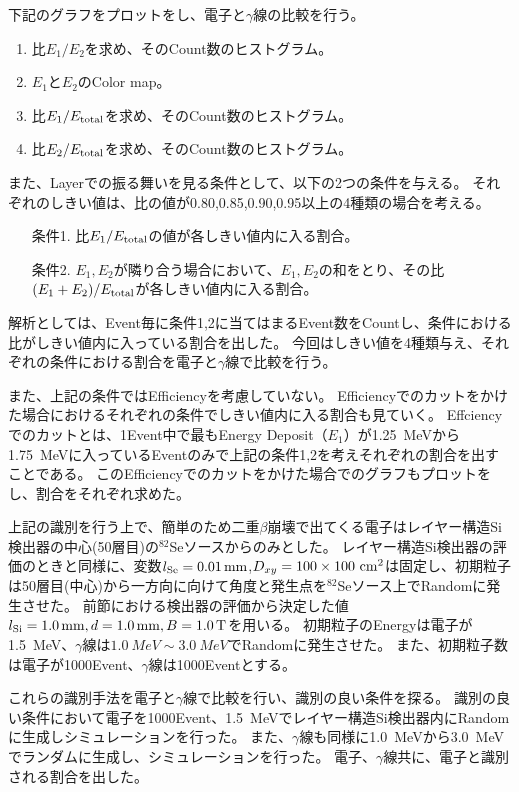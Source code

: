 \documentclass[a4paper,10pt]{jreport}
\begin{document}
下記のグラフをプロットをし、電子と$\gamma$線の比較を行う。

\begin{enumerate}
	\item 比$E_1/E_2$を求め、そのCount数のヒストグラム。
	\item $E_1$と$E_2$のColor map。
	\item 比$E_1/E_{\rm{total}}$を求め、そのCount数のヒストグラム。
	\item 比$E_2/E_{\rm{total}}$を求め、そのCount数のヒストグラム。
\end{enumerate}

また、Layerでの振る舞いを見る条件として、以下の2つの条件を与える。
それぞれのしきい値は、比の値が0.80,0.85,0.90,0.95以上の4種類の場合を考える。

\begin{enumerate}
	\item[条件1.] 比$E_1/E_{\rm{total}}$の値が各しきい値内に入る割合。
	\item[条件2.] $E_1,E_2$が隣り合う場合において、$E_1,E_2$の和をとり、その比$(E_1+E_2)/E_{\rm{total}}$が各しきい値内に入る割合。
\end{enumerate}

解析としては、Event毎に条件1,2に当てはまるEvent数をCountし、条件における比がしきい値内に入っている割合を出した。
今回はしきい値を4種類与え、それぞれの条件における割合を電子と$\gamma$線で比較を行う。

また、上記の条件ではEfficiencyを考慮していない。
Efficiencyでのカットをかけた場合におけるそれぞれの条件でしきい値内に入る割合も見ていく。
Effciencyでのカットとは、1Event中で最もEnergy Deposit（$E_1$）が\SI{1.25}{MeV}から\SI{1.75}{MeV}に入っているEventのみで上記の条件1,2を考えそれぞれの割合を出すことである。
このEfficiencyでのカットをかけた場合でのグラフもプロットをし、割合をそれぞれ求めた。

上記の識別を行う上で、簡単のため二重$\beta$崩壊で出てくる電子はレイヤー構造Si検出器の中心(50層目)の$^{82}$Seソースからのみとした。
レイヤー構造Si検出器の評価のときと同様に、変数$l_{\rm{Se}} = \SI{0.01}{mm}$,$D_{xy} =100\times100\ \rm{cm}^2$は固定し、初期粒子は50層目(中心)から一方向に向けて角度と発生点を$^{82}$Seソース上でRandomに発生させた。
前節における検出器の評価から決定した値$l_{\rm{Si}}=\SI{1.0}{mm}, d=\SI{1.0}{mm}, B=\SI{1.0}{T}$を用いる。
初期粒子のEnergyは電子が\SI{1.5}{MeV}、$\gamma$線は$\SI{1.0}{MeV}\sim\SI{3.0}{MeV}$でRandomに発生させた。
また、初期粒子数は電子が1000Event、$\gamma$線は1000Eventとする。


これらの識別手法を電子と$\gamma$線で比較を行い、識別の良い条件を探る。
識別の良い条件において電子を1000Event、\SI{1.5}{MeV}でレイヤー構造Si検出器内にRandomに生成しシミュレーションを行った。
また、$\gamma$線も同様に\SI{1.0}{MeV}から\SI{3.0}{MeV}でランダムに生成し、シミュレーションを行った。
電子、$\gamma$線共に、電子と識別される割合を出した。
\end{document}
